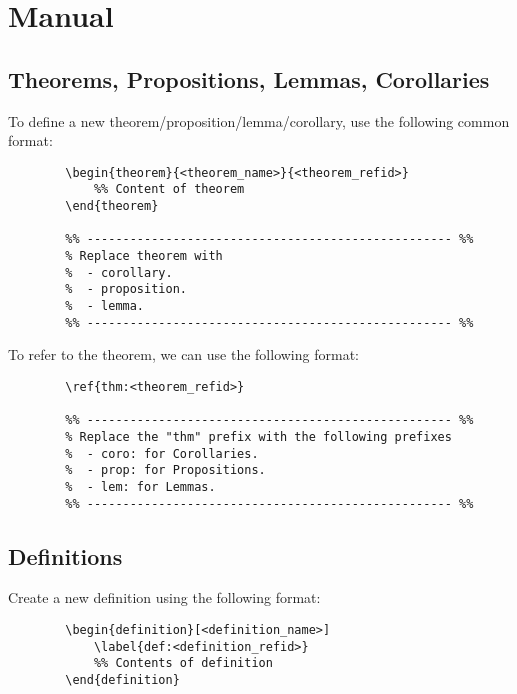 \newpage
\ifdefined\showmanual


\section{Manual}
\subsection{Theorems, Propositions, Lemmas, Corollaries}
\begin{definition}
    To define a new theorem/proposition/lemma/corollary, use the following common format:
    \begin{lstlisting}
        \begin{theorem}{<theorem_name>}{<theorem_refid>}
            %% Content of theorem
        \end{theorem}
    
        %% --------------------------------------------------- %%
        % Replace theorem with
        %  - corollary.
        %  - proposition.
        %  - lemma.
        %% --------------------------------------------------- %%
    \end{lstlisting}

    To refer to the theorem, we can use the following format:
    \begin{lstlisting}
        \ref{thm:<theorem_refid>}
    
        %% --------------------------------------------------- %%
        % Replace the "thm" prefix with the following prefixes
        %  - coro: for Corollaries.
        %  - prop: for Propositions.
        %  - lem: for Lemmas.
        %% --------------------------------------------------- %%
    \end{lstlisting}
\end{definition}


\subsection{Definitions}
\begin{definition}
    \noindent Create a new definition using the following format:
    \begin{lstlisting}
        \begin{definition}[<definition_name>]
            \label{def:<definition_refid>}
            %% Contents of definition 
        \end{definition}
    \end{lstlisting}    
\end{definition}


